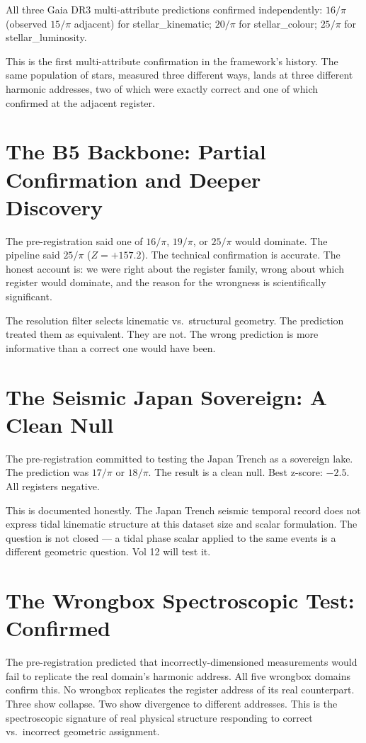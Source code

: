 \documentclass[11pt, letterpaper, openany]{book}
\begin{document}
\begin{empiricalbox}
All three Gaia DR3 multi-attribute predictions confirmed independently:
$16/\pi$ (observed $15/\pi$ adjacent) for stellar\_kinematic;
$20/\pi$ for stellar\_colour; $25/\pi$ for stellar\_luminosity.

This is the first multi-attribute confirmation in the framework's history.
The same population of stars, measured three different ways, lands at three
different harmonic addresses, two of which were exactly correct and one of
which confirmed at the adjacent register.

\section{The B5 Backbone: Partial Confirmation and Deeper Discovery}

The pre-registration said one of $16/\pi$, $19/\pi$, or $25/\pi$ would dominate.
The pipeline said $25/\pi$ ($Z=+157.2$). The technical confirmation is accurate.
The honest account is: we were right about the register family, wrong about
which register would dominate, and the reason for the wrongness is scientifically
significant.

The resolution filter selects kinematic vs.\ structural geometry. The prediction
treated them as equivalent. They are not. The wrong prediction is more informative
than a correct one would have been.

\section{The Seismic Japan Sovereign: A Clean Null}

The pre-registration committed to testing the Japan Trench as a sovereign lake.
The prediction was $17/\pi$ or $18/\pi$. The result is a clean null.
Best z-score: $-2.5$. All registers negative.

This is documented honestly. The Japan Trench seismic temporal record does
not express tidal kinematic structure at this dataset size and scalar formulation.
The question is not closed --- a tidal phase scalar applied to the same events
is a different geometric question. Vol 12 will test it.

\section{The Wrongbox Spectroscopic Test: Confirmed}

The pre-registration predicted that incorrectly-dimensioned measurements would
fail to replicate the real domain's harmonic address. All five wrongbox domains
confirm this. No wrongbox replicates the register address of its real counterpart.
Three show collapse. Two show divergence to different addresses. This is the
spectroscopic signature of real physical structure responding to correct vs.\
incorrect geometric assignment.


\end{empiricalbox}
\end{document}
